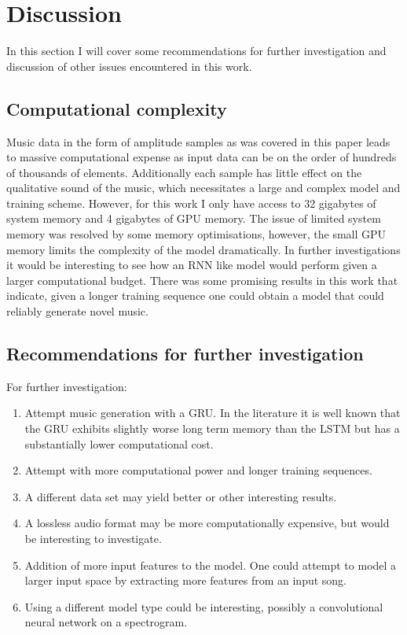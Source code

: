 \documentclass{article}
\begin{document}
\section{Discussion}
In this section I will cover some recommendations for further investigation and discussion of other issues encountered in this work. \\
\subsection{Computational complexity}
Music data in the form of amplitude samples as was covered in this paper leads to massive computational expense as input data can be on the order of hundreds of thousands of elements. Additionally each sample has little effect on the qualitative sound of the music, which necessitates a large and complex model and training scheme. However, for this work I only have access to 32 gigabytes of system memory and 4 gigabytes of GPU memory. The issue of limited system memory was resolved by some memory optimisations, however, the small GPU memory limits the complexity of the model dramatically. In further investigations it would be interesting to see how an RNN like model would perform given a larger computational budget. There was some promising results in this work that indicate, given a longer training sequence one could obtain a model that could reliably generate novel music. 


\subsection{Recommendations for further investigation}
For further investigation:
\begin{enumerate}
\item Attempt music generation with a GRU. In the literature it is well known that the GRU exhibits slightly worse long term memory than the LSTM but has a substantially lower computational cost. 
\item Attempt with more computational power and longer training sequences. 
\item A different data set may yield better or other interesting results.
\item A lossless audio format may be more computationally expensive, but would be interesting to investigate. 
\item Addition of more input features to the model. One could attempt to model a larger input space by extracting more features from an input song. 
\item Using a different model type could be interesting, possibly a convolutional neural network on a spectrogram.
\end{enumerate}
\end{document}

